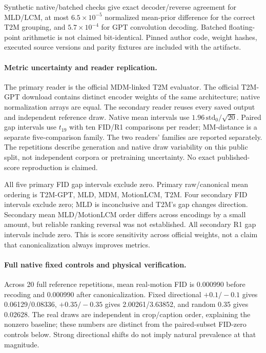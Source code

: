 \documentclass[10pt,twocolumn,letterpaper]{article}
\begin{document}
Synthetic native/batched checks give exact decoder/reverse agreement for MLD/LCM, at most $6.5\times 10^{-5}$ normalized mean-prior difference for the correct T2M grouping, and $5.7\times 10^{-4}$ for GPT convolution decoding. Batched floating-point arithmetic is not claimed bit-identical. Pinned author code, weight hashes, executed source versions and parity fixtures are included with the artifacts.

\paragraph{Metric uncertainty and reader replication.}
The primary reader is the official MDM-linked T2M evaluator. The official T2M-GPT download contains distinct encoder weights of the same architecture; native normalization arrays are equal. The secondary reader reuses every saved output and independent reference draw. Native mean intervals use $1.96\,\mathrm{std}_{0}/\sqrt{20}$. Paired gap intervals use $t_{19}$ with ten FID/R1 comparisons per reader; MM-distance is a separate five-comparison family. The two readers' families are reported separately. The repetitions describe generation and native draw variability on this public split, not independent corpora or pretraining uncertainty. No exact published-score reproduction is claimed.


All five primary FID gap intervals exclude zero. Primary raw/canonical mean ordering is T2M-GPT, MLD, MDM, MotionLCM, T2M. Four secondary FID intervals exclude zero; MLD is inconclusive and T2M's gap changes direction. Secondary mean MLD/MotionLCM order differs across encodings by a small amount, but reliable ranking reversal was not established. All secondary R1 gap intervals include zero. This is score sensitivity across official weights, not a claim that canonicalization always improves metrics.

\paragraph{Full native fixed controls and physical verification.}
Across 20 full reference repetitions, mean real-motion FID is 0.000990 before recoding and 0.000990 after canonicalization. Fixed directional $+0.1/-0.1$ gives 0.06129/0.08336, $+0.35/-0.35$ gives 2.00261/3.63852, and random 0.35 gives 0.02628. The real draws are independent in crop/caption order, explaining the nonzero baseline; these numbers are distinct from the paired-subset FID-zero controls below. Strong directional shifts do not imply natural prevalence at that magnitude.
\end{document}
